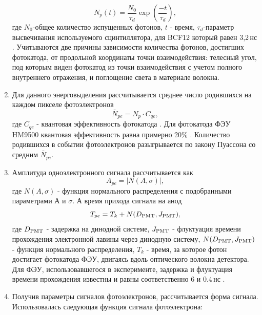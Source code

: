 \begin{enumerate}
	\begin{equation}
	N_p(t) = \frac{N_{0}}{\tau_{d}}\exp\left(\frac{-t}{\tau_{d}}\right),
	\label{scintSHAPE}
	\end{equation}
	где $N_{0}$-общее количество испущенных фотонов, $t$ - время, $\tau_{d}$-параметр высвечивания используемого сцинтиллятора, для BCF12 который равен 3,2\,нс \cite{crystals}. 
	Учитываются две причины зависимости количества фотонов, достигших фотокатода, от продольной координаты точки взаимодействия: телесный угол, под которым виден фотокатод из точки взаимодействия с учетом полного внутреннего отражения, и поглощение света в материале волокна.
	\item Для данного энерговыделения рассчитывается среднее число родившихся на каждом пикселе фотоэлектронов 
	\begin{equation}
	\bar{N}_{pe} = N_p \cdot C_{qe},
	\end{equation}
	где $C_{qe}$ - квантовая эффективность фотокатода \cite{vratislav}. Для фотокатода ФЭУ HM9500 квантовая эффективность равна примерно 20\% \cite{Hamamatsu}.
	Количество родившихся в событии фотоэлектронов разыгрывается по закону Пуассона со средним $\bar{N}_{pe}$.
	\item
	Амплитуда одноэлектронного сигнала рассчитывается как
	\begin{equation}
	A_{pe}=|N(A,\sigma)|,
	\end{equation}
	где $N(A,\sigma)$ - функция нормального распределения с подобранными параметрами А и $\sigma$.
	А время прихода сигнала на анод
	\begin{equation}
	T_{pe}=T_k+N(D_{\rm PMT},J_{\rm PMT}),
	\end{equation}
	где $D_{\rm PMT}$ - задержка на динодной системе, $J_{\rm PMT}$ - флуктуация времени прохождения электронной лавины через динодную систему, $N(D_{\rm PMT},J_{\rm PMT})$ - функция нормального распределения, $T_k$ - время, за которое фотон достигает фотокатода ФЭУ, двигаясь вдоль оптического волокна детектора. Для ФЭУ, использовавшегося в эксперименте, задержка и флуктуация времени прохождения известны и равны соответственно 6 и 0.4\,нс \cite{Hamamatsu}.
	\item Получив параметры сигналов фотоэлектронов, рассчитывается форма сигнала. Использовалась следующая функция сигнала фотоэлектрона: 

\end{enumerate}
